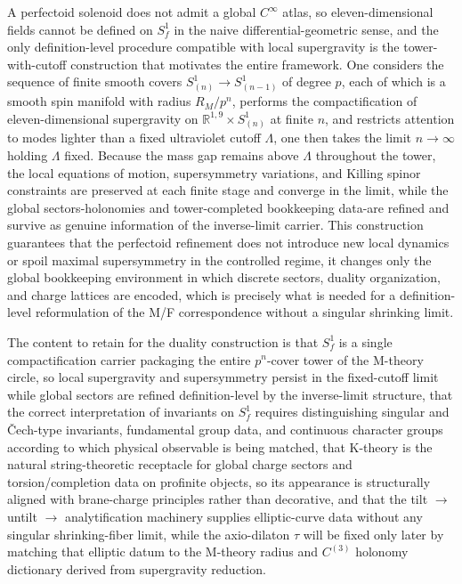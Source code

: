 \documentclass[11pt]{article}
\theoremstyle{remark}
\newcommand{\R}{\mathbb{R}}
\begin{document}
A perfectoid solenoid does not admit a global \(C^\infty\) atlas, so eleven-dimensional fields cannot be defined on \(S_f^1\) in the naive differential-geometric sense, and the only definition-level procedure compatible with local supergravity is the tower-with-cutoff construction that motivates the entire framework. One considers the sequence of finite smooth covers \(S^1_{(n)}\to S^1_{(n-1)}\) of degree \(p\), each of which is a smooth spin manifold with radius \(R_M/p^n\), performs the compactification of eleven-dimensional supergravity on \(\R^{1,9}\times S^1_{(n)}\) at finite \(n\), and restricts attention to modes lighter than a fixed ultraviolet cutoff \(\Lambda\), one then takes the limit \(n\to\infty\) holding \(\Lambda\) fixed. Because the mass gap remains above \(\Lambda\) throughout the tower, the local equations of motion, supersymmetry variations, and Killing spinor constraints are preserved at each finite stage and converge in the limit, while the global sectors-holonomies and tower-completed bookkeeping data-are refined and survive as genuine information of the inverse-limit carrier. This construction guarantees that the perfectoid refinement does not introduce new local dynamics or spoil maximal supersymmetry in the controlled regime, it changes only the global bookkeeping environment in which discrete sectors, duality organization, and charge lattices are encoded, which is precisely what is needed for a definition-level reformulation of the M/F correspondence without a singular shrinking limit.

The content to retain for the duality construction is that \(S_f^1\) is a single compactification carrier packaging the entire \(p^n\)-cover tower of the M-theory circle, so local supergravity and supersymmetry persist in the fixed-cutoff limit while global sectors are refined definition-level by the inverse-limit structure, that the correct interpretation of invariants on \(S_f^1\) requires distinguishing singular and \v{C}ech-type invariants, fundamental group data, and continuous character groups according to which physical observable is being matched, that K-theory is the natural string-theoretic receptacle for global charge sectors and torsion/completion data on profinite objects, so its appearance is structurally aligned with brane-charge principles rather than decorative, and that the tilt \(\to\) untilt \(\to\) analytification machinery supplies elliptic-curve data without any singular shrinking-fiber limit, while the axio-dilaton \(\tau\) will be fixed only later by matching that elliptic datum to the M-theory radius and \(C^{(3)}\) holonomy dictionary derived from supergravity reduction.
\end{document}
